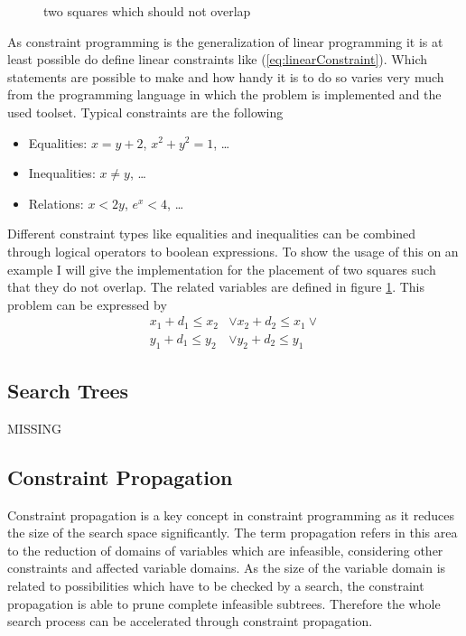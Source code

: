 \documentclass[10pt,
               a4paper,
               journal,
               ]{IEEEtran}
\newcommand{\reffig}[1]{{figure \ref{#1}}}
\newcommand{\refeq}[1]{{(\ref{#1})}}
\begin{document}
	\begin{figure}
	\center
	\caption{two squares which should not overlap}
	\label{fig:squares}
	\end{figure}
	
	As constraint programming is the generalization of linear programming it is at least possible do define linear constraints like \refeq{eq:linearConstraint}. Which statements are possible to make and how handy it is to do so varies very much from the programming language in which the problem is implemented and the used toolset. Typical constraints are the following
	\begin{itemize}
		\item Equalities: $x = y + 2$, $x^2 + y^2 = 1$, \dots
		\item Inequalities: $x \ne y$, \dots
		\item Relations: $x < 2 y$, $e^x < 4$, \dots
	\end{itemize}
	
	Different constraint types like equalities and inequalities can be combined through logical operators to boolean expressions. To show the usage of this on an example I will give the implementation for the placement of two squares such that they do not overlap. The related variables are defined in \reffig{fig:squares}. This problem can be expressed by \cite[p. 101]{programmingGecode}
	\begin{equation}
	\begin{split}
		x_1 + d_1 \le x_2 & \lor x_2 + d_2 \le x_1 \lor \\
		y_1 + d_1 \le y_2 & \lor y_2 + d_2 \le y_1
	\end{split}
	\end{equation}
	
	\subsection{Search Trees}
	MISSING
	
	\subsection{Constraint Propagation}
	Constraint propagation is a key concept in constraint programming as it reduces the size of the search space significantly. The term propagation refers in this area to the reduction of domains of variables which are infeasible, considering other constraints and affected variable domains. As the size of the variable domain is related to possibilities which have to be checked by a search, the constraint propagation is able to prune complete infeasible subtrees. Therefore the whole search process can be accelerated through constraint propagation.
	
\end{document}
